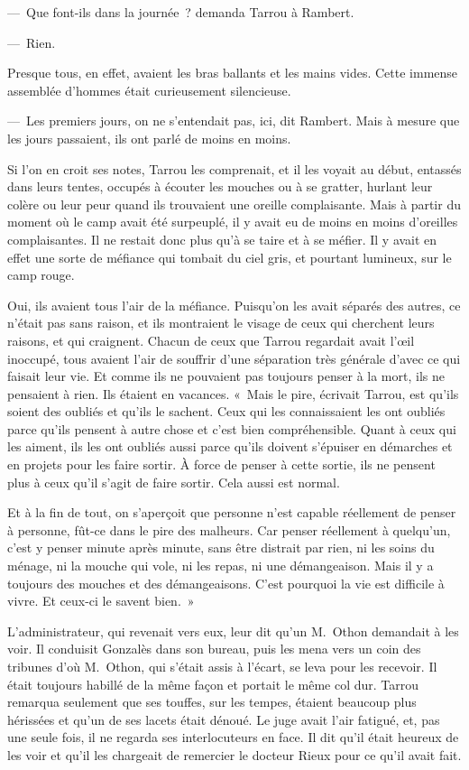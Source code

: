 \documentclass[french,twoside]{book} %
\begin{document}
— Que font-ils dans la journée ? demanda Tarrou à Rambert.\par
— Rien.\par
Presque tous, en effet, avaient les bras ballants et les mains vides. Cette immense assemblée d’hommes était curieusement silencieuse.\par
— Les premiers jours, on ne s’entendait pas, ici, dit Rambert. Mais à mesure que les jours passaient, ils ont parlé de moins en moins.\par
Si l’on en croit ses notes, Tarrou les comprenait, et il les voyait au début, entassés dans leurs tentes, occupés à écouter les mouches ou à se gratter, hurlant leur colère ou leur peur quand ils trouvaient une oreille complaisante. Mais à partir du moment où le camp avait été surpeuplé, il y avait eu de moins en moins d’oreilles complaisantes. Il ne restait donc plus qu’à se taire et à se méfier. Il y avait en effet une sorte de méfiance qui tombait du ciel gris, et pourtant lumineux, sur le camp rouge.\par
Oui, ils avaient tous l’air de la méfiance. Puisqu’on les avait séparés des autres, ce n’était pas sans raison, et ils montraient le visage de ceux qui cherchent leurs raisons, et qui craignent. Chacun de ceux que Tarrou regardait avait l’œil inoccupé, tous avaient l’air de souffrir d’une séparation très générale d’avec ce qui faisait leur vie. Et comme ils ne pouvaient pas toujours penser à la mort, ils ne pensaient à rien. Ils étaient en vacances. « Mais le pire, écrivait Tarrou, est qu’ils soient des oubliés et qu’ils le sachent. Ceux qui les connaissaient les ont oubliés parce qu’ils pensent à autre chose et c’est bien compréhensible. Quant à ceux qui les aiment, ils les ont oubliés aussi parce qu’ils doivent s’épuiser en démarches et en projets pour les faire sortir. À force de penser à cette sortie, ils ne pensent plus à ceux qu’il s’agit de faire sortir. Cela aussi est normal.\par
Et à la fin de tout, on s’aperçoit que personne n’est capable réellement de penser à personne, fût-ce dans le pire des malheurs. Car penser réellement à quelqu’un, c’est y penser minute après minute, sans être distrait par rien, ni les soins du ménage, ni la mouche qui vole, ni les repas, ni une démangeaison. Mais il y a toujours des mouches et des démangeaisons. C’est pourquoi la vie est difficile à vivre. Et ceux-ci le savent bien. »\par
L’administrateur, qui revenait vers eux, leur dit qu’un M. Othon demandait à les voir. Il conduisit Gonzalès dans son bureau, puis les mena vers un coin des tribunes d’où M. Othon, qui s’était assis à l’écart, se leva pour les recevoir. Il était toujours habillé de la même façon et portait le même col dur. Tarrou remarqua seulement que ses touffes, sur les tempes, étaient beaucoup plus hérissées et qu’un de ses lacets était dénoué. Le juge avait l’air fatigué, et, pas une seule fois, il ne regarda ses interlocuteurs en face. Il dit qu’il était heureux de les voir et qu’il les chargeait de remercier le docteur Rieux pour ce qu’il avait fait.\par
\end{document}
